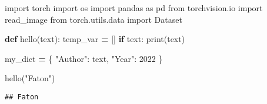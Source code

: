 \documentclass[
]{book}
\newenvironment{Shaded}{\begin{snugshade}}{\end{snugshade}}
\newcommand{\BuiltInTok}[1]{#1}
\newcommand{\ControlFlowTok}[1]{\textcolor[rgb]{0.13,0.29,0.53}{\textbf{#1}}}
\newcommand{\DecValTok}[1]{\textcolor[rgb]{0.00,0.00,0.81}{#1}}
\newcommand{\ImportTok}[1]{#1}
\newcommand{\KeywordTok}[1]{\textcolor[rgb]{0.13,0.29,0.53}{\textbf{#1}}}
\newcommand{\NormalTok}[1]{#1}
\newcommand{\OperatorTok}[1]{\textcolor[rgb]{0.81,0.36,0.00}{\textbf{#1}}}
\newcommand{\StringTok}[1]{\textcolor[rgb]{0.31,0.60,0.02}{#1}}
\begin{document}
\begin{Shaded}
\begin{Highlighting}[]
\ImportTok{import}\NormalTok{ torch}
\ImportTok{import}\NormalTok{ os}
\ImportTok{import}\NormalTok{ pandas }\ImportTok{as}\NormalTok{ pd}
\ImportTok{from}\NormalTok{ torchvision.io }\ImportTok{import}\NormalTok{ read\_image}
\ImportTok{from}\NormalTok{ torch.utils.data }\ImportTok{import}\NormalTok{ Dataset}


\KeywordTok{def}\NormalTok{ hello(text):}
\NormalTok{  temp\_var }\OperatorTok{=}\NormalTok{ []}
  \ControlFlowTok{if}\NormalTok{ text:}
    \BuiltInTok{print}\NormalTok{(text)}
    
\NormalTok{  my\_dict }\OperatorTok{=}\NormalTok{ \{}
    \StringTok{"Author"}\NormalTok{: text,}
    \StringTok{"Year"}\NormalTok{: }\DecValTok{2022}
\NormalTok{  \}}
  
\NormalTok{hello(}\StringTok{"Faton"}\NormalTok{)}
\end{Highlighting}
\end{Shaded}

\begin{verbatim}
## Faton
\end{verbatim}
\end{document}

